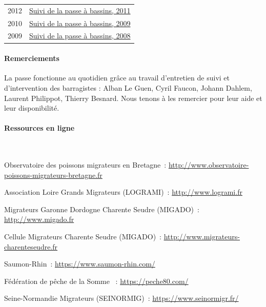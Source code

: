 \documentclass[11pt,twocolumn,titlepage,twoside]{article}\usepackage[]{graphicx}\usepackage[]{color}
\begin{document}
\begin{table}[htbp]
\begin{tabular}{lp{7cm}}
2012 &
\href{https://eptbvilaine56.sharepoint.com/:b:/g/extranet/EWQJkGynJO9FkLtMc0evglwBhVC3k2ORqwqhA_ez-fecKQ?e=xaK6zo}{Suivi
de la passe à bassins, 2011}\\
2010 &
\href{https://eptbvilaine56.sharepoint.com/:b:/g/extranet/ETTqqTILtm5OjioHyGGAsooBsGVP5CgR9fE-xCj-evifLA?e=2I4CbN}{Suivi
de la passe à bassins, 2009}\\
2009 &
\href{https://eptbvilaine56.sharepoint.com/:b:/g/extranet/ESOYjucqRlRNm4hXNuO3-EgBBOTq0zMqmhq0u125J21Yxw?e=EbCzao}{Suivi
de la passe à bassins, 2008}\\
%
\bottomrule
\end{tabular}
\label{table_references}
\end{table}

\bigskip
\paragraph{Remerciements}

La passe fonctionne au quotidien grâce au travail d'entretien de suivi et
d'intervention des barragistes : Alban Le Guen, Cyril Faucon, Johann Dahlem,
Laurent Philippot, Thierry Besnard. Nous tenons à les remercier pour leur aide
et leur disponibilité.
\bigskip

\vfill
\paragraph{Ressources en ligne} ~

Observatoire des poissons migrateurs en Bretagne~:
\href{http://www.observatoire-poissons-migrateurs-bretagne.fr}{{http://www.observatoire-poissons-migrateurs-bretagne.fr}}

Association Loire Grands Migrateurs (LOGRAMI)~:
\href{http://www.logrami.fr}{{http://www.logrami.fr}}

Migrateurs Garonne Dordogne Charente Seudre (MIGADO)~:
\href{http://www.migado.fr}{{http://www.migado.fr}}

Cellule Migrateurs Charente Seudre (MIGADO)~:
\href{http://www.migrateurs-charenteseudre.fr}{{http://www.migrateurs-charenteseudre.fr}}

Saumon-Rhin~:   
\href{https://www.saumon-rhin.com/}{{https://www.saumon-rhin.com/}}

Fédération de pêche de la Somme ~: 
\href{https://peche80.com/}{{https://peche80.com/}}

Seine-Normandie Migrateurs (SEINORMIG)~:    
\href{https://www.seinormigr.fr/}{{https://www.seinormigr.fr/}}
\end{document}
